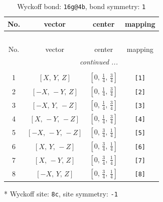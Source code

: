 \documentclass[fleqn,8pt]{jsarticle}
\begin{document}
\renewcommand{\arraystretch}{1.2}
\begin{longtable}{cccc}
\caption{Wyckoff bond: {\tt 16g@4b}, bond symmetry: {\tt 1}}
 \\
 \hline \hline
No. & vector & center & mapping \\ \hline \endfirsthead

\multicolumn{3}{l}{\tablename\ \thetable{}} \\
 \hline \hline
No. & vector & center & mapping \\ \hline \endhead

 \hline \hline
\multicolumn{3}{r}{\footnotesize\it continued ...} \\ \endfoot

 \hline \hline
\multicolumn{3}{r}{} \\ \endlastfoot

1 & $\left[ X,\, Y,\, Z \right]$ & $\left[ 0,\, \frac{1}{4},\, \frac{3}{4} \right]$ & {\tt [1]} \\ \hline
2 & $\left[ - X,\, - Y,\, Z \right]$ & $\left[ 0,\, \frac{1}{4},\, \frac{3}{4} \right]$ & {\tt [2]} \\ \hline
3 & $\left[ - X,\, Y,\, - Z \right]$ & $\left[ 0,\, \frac{1}{4},\, \frac{3}{4} \right]$ & {\tt [3]} \\ \hline
4 & $\left[ X,\, - Y,\, - Z \right]$ & $\left[ 0,\, \frac{1}{4},\, \frac{3}{4} \right]$ & {\tt [4]} \\ \hline
5 & $\left[ - X,\, - Y,\, - Z \right]$ & $\left[ 0,\, \frac{3}{4},\, \frac{1}{4} \right]$ & {\tt [5]} \\ \hline
6 & $\left[ X,\, Y,\, - Z \right]$ & $\left[ 0,\, \frac{3}{4},\, \frac{1}{4} \right]$ & {\tt [6]} \\ \hline
7 & $\left[ X,\, - Y,\, Z \right]$ & $\left[ 0,\, \frac{3}{4},\, \frac{1}{4} \right]$ & {\tt [7]} \\ \hline
8 & $\left[ - X,\, Y,\, Z \right]$ & $\left[ 0,\, \frac{3}{4},\, \frac{1}{4} \right]$ & {\tt [8]} \\
\end{longtable}
* Wyckoff site: {\tt 8c}, site symmetry: {\tt -1}
\renewcommand{\arraystretch}{1.2}
\end{document}

